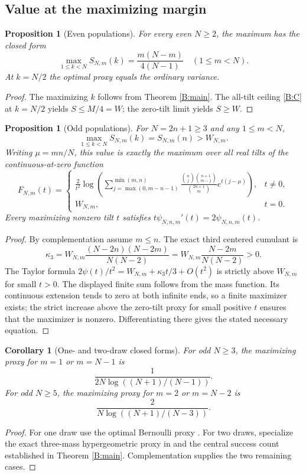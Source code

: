 \documentclass[11pt,a4paper]{article}
\newtheorem{proposition}[theorem]{Proposition}
\newtheorem{corollary}[theorem]{Corollary}
\begin{document}
\subsection{Value at the maximizing margin}
\begin{proposition}[Even populations]\label{B:even}
For every even $N\ge2$, the maximum has the closed form
\[
\max_{1\le k<N} S_{N,m}(k)=\frac{m(N-m)}{4(N-1)}
\quad(1\le m<N).
\]
At $k=N/2$ the optimal proxy equals the ordinary variance.
\end{proposition}
\begin{proof}
The maximizing $k$ follows from Theorem \ref{B:main}.
The all-tilt ceiling \eqref{B:C} at $k=N/2$ yields
$S\le M/4=W$; the zero-tilt limit yields $S\ge W$.
\end{proof}

\begin{proposition}[Odd populations]\label{B:odd}
For $N=2n+1\ge3$ and any $1\le m<N$,
\[
\max_{1\le k<N}S_{N,m}(k)=S_{N,m}(n)>W_{N,m}.
\]
Writing $\mu=mn/N$, this value is exactly the maximum
over all real tilts of the continuous-at-zero function
\[
F_{N,m}(t)=
\begin{cases}
\displaystyle\frac{2}{t^2}\log\!
\left(\sum_{j=\max(0,m-n-1)}^{\min(m,n)}
\frac{\binom{n}{j}\binom{n+1}{m-j}}{\binom{2n+1}{m}}
e^{t(j-\mu)}\right),&t\ne0,\\[10pt]
W_{N,m},&t=0.
\end{cases}
\]
Every maximizing nonzero tilt $t$ satisfies
$t\psi_{N,n,m}'(t)=2\psi_{N,n,m}(t)$.
\end{proposition}
\begin{proof}
By complementation assume $m\le n$. The exact third
centered cumulant is
\[
\kappa_3=
W_{N,m}\frac{(N-2n)(N-2m)}{N(N-2)}
=W_{N,m}\frac{N-2m}{N(N-2)}>0.
\]
The Taylor formula
$2\psi(t)/t^2=W_{N,m}+\kappa_3t/3+O(t^2)$
is strictly above $W_{N,m}$ for small $t>0$.
The displayed finite sum follows from the mass function.
Its continuous extension tends to zero at both infinite ends,
so a finite maximizer exists; the strict increase above the zero-tilt proxy for small positive $t$ ensures that the maximizer is nonzero.
Differentiating there gives the stated necessary equation.
\end{proof}

\begin{corollary}[One- and two-draw closed forms]\label{B:small}
For odd $N\ge3$, the maximizing proxy for $m=1$ or $m=N-1$ is
\[
\frac1{2N\log((N+1)/(N-1))}.
\]
For odd $N\ge5$, the maximizing proxy for $m=2$ or $m=N-2$ is
\[
\frac2{N\log((N+1)/(N-3))}.
\]
\end{corollary}
\begin{proof}
For one draw use the optimal Bernoulli proxy
\cite{ArbelMarchalNguyen}. For two draws, specialize the exact three-mass
hypergeometric proxy in \cite{AtouaniMarchalArbel} and the
central success count established in Theorem \ref{B:main}.
Complementation supplies the two remaining cases.
\end{proof}
\end{document}
